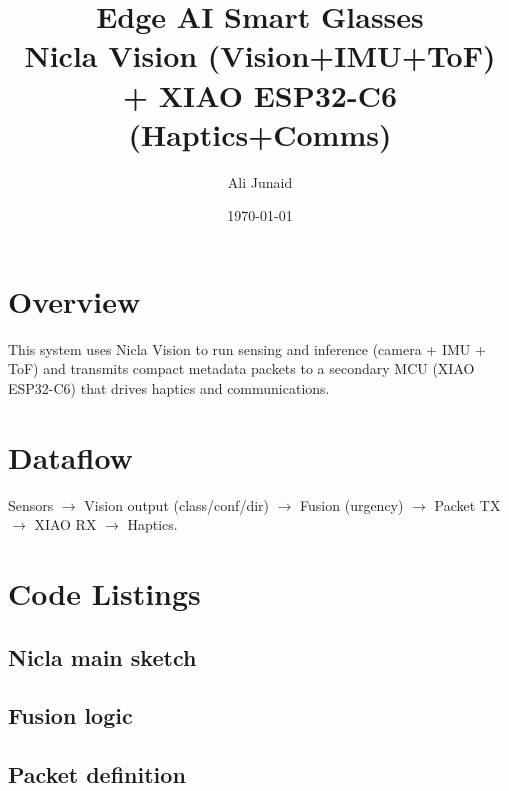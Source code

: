 \documentclass[11pt]{article}
\title{Edge AI Smart Glasses\\Nicla Vision (Vision+IMU+ToF) + XIAO ESP32-C6 (Haptics+Comms)}
\author{Ali Junaid}
\date{\today}
\begin{document}
\maketitle

\section{Overview}
This system uses Nicla Vision to run sensing and inference (camera + IMU + ToF) and transmits compact metadata packets to a secondary MCU (XIAO ESP32-C6) that drives haptics and communications.

\section{Dataflow}
Sensors $\rightarrow$ Vision output (class/conf/dir) $\rightarrow$ Fusion (urgency) $\rightarrow$ Packet TX $\rightarrow$ XIAO RX $\rightarrow$ Haptics.

\section{Code Listings}
\subsection{Nicla main sketch}


\subsection{Fusion logic}


\subsection{Packet definition}

\end{document}
